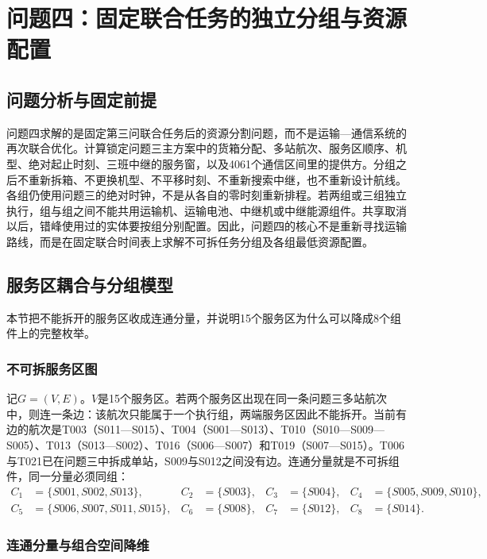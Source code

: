 \section{问题四：固定联合任务的独立分组与资源配置}

\subsection{问题分析与固定前提}

问题四求解的是固定第三问联合任务后的资源分割问题，而不是运输—通信系统的再次联合优化。计算锁定问题三主方案中的货箱分配、多站航次、服务区顺序、机型、绝对起止时刻、三班中继的服务窗，以及4061个通信区间里的提供方。分组之后不重新拆箱、不更换机型、不平移时刻、不重新搜索中继，也不重新设计航线。各组仍使用问题三的绝对时钟，不是从各自的零时刻重新排程。若两组或三组独立执行，组与组之间不能共用运输机、运输电池、中继机或中继能源组件。共享取消以后，错峰使用过的实体要按组分别配置。因此，问题四的核心不是重新寻找运输路线，而是在固定联合时间表上求解不可拆任务分组及各组最低资源配置。

\subsection{服务区耦合与分组模型}

本节把不能拆开的服务区收成连通分量，并说明15个服务区为什么可以降成8个组件上的完整枚举。

\subsubsection{不可拆服务区图}

记$G=(V,E)$。$V$是15个服务区。若两个服务区出现在同一条问题三多站航次中，则连一条边：该航次只能属于一个执行组，两端服务区因此不能拆开。当前有边的航次是T003（S011—S015）、T004（S001—S013）、T010（S010—S009—S005）、T013（S013—S002）、T016（S006—S007）和T019（S007—S015）。T006与T021已在问题三中拆成单站，S009与S012之间没有边。连通分量就是不可拆组件，同一分量必须同组：
\begin{equation}
\begin{aligned}
C_1&=\{S001,S002,S013\},&
C_2&=\{S003\},&
C_3&=\{S004\},&
C_4&=\{S005,S009,S010\},\\
C_5&=\{S006,S007,S011,S015\},&
C_6&=\{S008\},&
C_7&=\{S012\},&
C_8&=\{S014\}.
\end{aligned}
\label{eq:components}
\end{equation}

\subsubsection{连通分量与组合空间降维}

